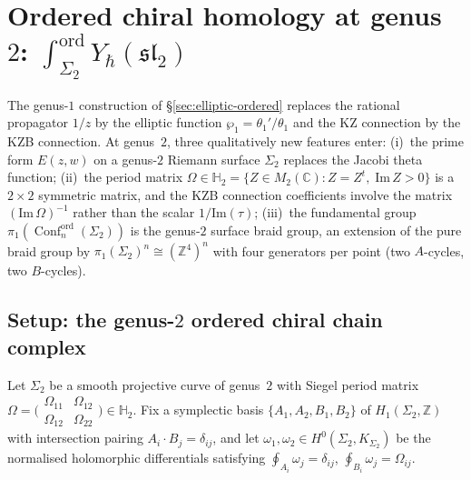 \documentclass[11pt,reqno]{amsart}
\theoremstyle{definition}
\theoremstyle{remark}
\DeclareMathOperator{\Conf}{Conf}
\newcommand{\CC}{\mathbb{C}}
\newcommand{\ZZ}{\mathbb{Z}}
\newcommand{\HHH}{\mathbb{H}}
\numberwithin{equation}{section}
\begin{document}

\section{Ordered chiral homology at genus~$2$:
$\int_{\Sigma_2}^{\mathrm{ord}} Y_\hbar(\mathfrak{sl}_2)$}
\label{sec:genus2-ordered}

The genus-$1$ construction of \S\ref{sec:elliptic-ordered}
replaces the rational propagator $1/z$ by the elliptic
function $\wp_1 = \theta_1'/\theta_1$ and the KZ connection
by the KZB connection. At genus~$2$, three qualitatively
new features enter: (i)~the prime form $E(z,w)$ on a
genus-$2$ Riemann surface $\Sigma_2$ replaces the Jacobi
theta function; (ii)~the period matrix
$\Omega \in \HHH_2 = \{Z \in M_2(\CC) : Z = Z^t,\;
\mathrm{Im}\,Z > 0\}$ is a $2 \times 2$ symmetric matrix,
and the KZB connection coefficients involve the matrix
$(\mathrm{Im}\,\Omega)^{-1}$ rather than the scalar
$1/\mathrm{Im}(\tau)$; (iii)~the fundamental group
$\pi_1(\Conf_n^{\mathrm{ord}}(\Sigma_2))$ is the genus-$2$
surface braid group, an extension of the pure braid group
by $\pi_1(\Sigma_2)^n \cong (\ZZ^4)^n$ with four generators
per point (two $A$-cycles, two $B$-cycles).

\subsection{Setup: the genus-$2$ ordered chiral chain
complex}
\label{subsec:genus2-setup}

Let $\Sigma_2$ be a smooth projective curve of genus~$2$
with Siegel period matrix
$\Omega = \bigl(\begin{smallmatrix}
\Omega_{11} & \Omega_{12} \\
\Omega_{12} & \Omega_{22}
\end{smallmatrix}\bigr)
\in \HHH_2$.
Fix a symplectic basis
$\{A_1, A_2, B_1, B_2\}$ of $H_1(\Sigma_2, \ZZ)$
with intersection pairing
$A_i \cdot B_j = \delta_{ij}$, and let
$\omega_1, \omega_2 \in H^0(\Sigma_2, K_{\Sigma_2})$
be the normalised holomorphic differentials satisfying
$\oint_{A_i} \omega_j = \delta_{ij}$,
$\oint_{B_i} \omega_j = \Omega_{ij}$.
\end{document}
